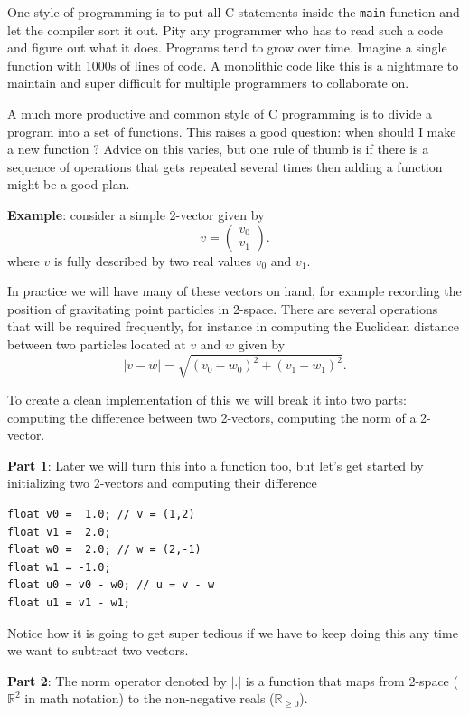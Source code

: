 One style of programming is to put all C statements inside the \texttt{main} function and let the compiler sort it out. Pity any programmer who has to read such a code and figure out what it does. Programs tend to grow over time. Imagine a single function with 1000s of lines of code. A monolithic code like this is a nightmare to maintain and super difficult for multiple programmers to collaborate on.

A much more productive and common style of C programming is to divide a program into a set of functions. This raises a good question: when should I make a new function ? Advice on this varies, but one rule of thumb is if there is a sequence of operations that gets repeated several times then adding a function might be a good plan.

{\bf Example}: consider a simple 2-vector given by
\[
v = \left( \begin{array}{c}
v_0\\ v_1\end{array} \right).
\]
where $v$ is fully described by two real values $v_0$ and $v_1$.

In practice we will have many of these vectors on hand, for example recording the position of gravitating point particles in 2-space. There are several operations that will be required frequently, for instance in computing the Euclidean distance between two particles located at $v$ and $w$ given by
\[
| v - w | = \sqrt{(v_0-w_0)^2 + (v_1-w_1)^2}.
\]

To create a clean implementation of this we will break it into two parts: computing the difference between two 2-vectors,  computing the norm of a 2-vector.

{\bf Part 1}: Later we will turn this into a function too, but let's get started by initializing two 2-vectors and computing their difference

\begin{verbatim}
float v0 =  1.0; // v = (1,2)
float v1 =  2.0;
float w0 =  2.0; // w = (2,-1)
float w1 = -1.0; 
float u0 = v0 - w0; // u = v - w
float u1 = v1 - w1;
\end{verbatim}

Notice how it is going to get super tedious if we have to keep doing this any time we want to subtract two vectors.

{\bf Part 2}: The norm operator denoted by $|.|$ is  a function that maps from 2-space ($\mathbb{R}^2$ in math notation) to the non-negative reals ($\mathbb{R}_{\geq0}$). 


